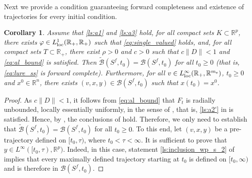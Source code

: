 \documentclass[a4paper,11pt]{article}
\newcommand{\R}{\mathbb R}
\newcommand{\sB}{{\mathcal B}}
\numberwithin{equation}{section}
\numberwithin{figure}{section}
\numberwithin{table}{section}
\newtheorem{corollary}[theorem]{Corollary}
\begin{document}
%
Next we provide a condition guaranteeing forward completeness and existence of trajectories for every initial condition.
%
\begin{corollary}\label{cor:inclusion_wp}
Assume that \ref{ls:a1} and \ref{ls:a3} hold, for all compact sets $K\subset\R^p$, there exists $\varphi\in L^1_{\rm loc}(\R_+,\R_+)$ such that \eqref{eq:single_valued} holds, and,
for all compact sets $T\subset\R_+$, there exist $\rho>0$ and $c>0$ such that $c\|D\|<1$ and
\eqref{eq:al_bound} is satisfied. Then $\tilde\sB(S^f,t_0)=\sB(S^f,t_0)$ for all $t_0\geq 0$ {\rm (}that is, \eqref{eq:lure_ss} is forward complete{\rm )}. Furthermore, for all $v\in L^\infty_{\rm loc}(\R_+,\R^{m_{\rm e}})$, $t_0\geq 0$ and $x^0\in\R^n$, there exists $(v,x,y)\in \sB(S^f,t_0)$ such that $x(t_0)=x^0$.
\end{corollary}
%
\begin{proof}
As $c\|D\|<1$, it follows from \eqref{eq:al_bound} that $F_t$ is radially unbounded, locally essentially uniformly, in the sense of , that is, \ref{ls:a2'} in 
is satisfied. Hence, by  , the conclusions of  hold. Therefore, we only need to establish that  $\tilde\sB(S^f,t_0)=\sB(S^f,t_0)$ for all $t_0\geq 0$. To this end, let $(v,x,y)$ be a pre-trajectory defined on $[t_0,\tau)$, where $t_0<\tau<\infty$. It is sufficient to prove that $y\in L^\infty([t_0,\tau),\R^p)$. Indeed, in this case,
statement \ref{ls:inclusion_wp_s_2} of  implies that every maximally defined trajectory starting at $t_0$ is defined on $[t_0,\infty)$ and is therefore in $\sB(S^f,t_0)$.


\end{proof}
\end{document}
